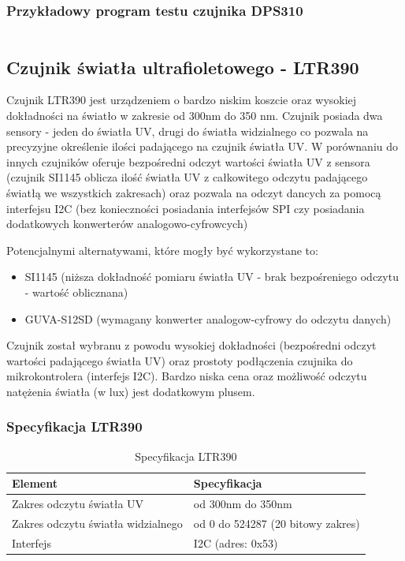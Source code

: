 \documentclass[12pt,a4paper]{article}
\begin{document}
\subsubsection{Przykładowy program testu czujnika DPS310}

\begin{code}[H]
\inputminted[frame=lines,baselinestretch=1,breaklines,linenos,xleftmargin=1.5em]{c}{../proj/dps310-test/dps310-test.ino}

\caption{Test czujnika DPS310}
\end{code}

\subsection{Czujnik światła ultrafioletowego - LTR390}

Czujnik LTR390 jest urządzeniem o bardzo niskim koszcie oraz wysokiej dokładności na światło w zakresie od 300nm do 350 nm. Czujnik posiada dwa sensory - jeden do światła UV, drugi do światła widzialnego 
co pozwala na precyzyjne określenie ilości padającego na czujnik światła UV. W porównaniu do innych czujników oferuje bezpośredni odczyt wartości światła UV z sensora (czujnik SI1145 oblicza ilość światła UV z całkowitego odczytu padającego światłą we wszystkich zakresach) 
oraz pozwala na odczyt dancych za pomocą interfejsu I2C (bez konieczności posiadania interfejsów SPI czy posiadania dodatkowych konwerterów analogowo-cyfrowcych) 

Potencjalnymi alternatywami, które mogły być wykorzystane to:
\begin{itemize}
    \item SI1145 (niższa dokładność pomiaru światła UV - brak bezpośreniego odczytu - wartość oblicznana)
    \item GUVA-S12SD (wymagany konwerter analogow-cyfrowy do odczytu danych)
\end{itemize}

Czujnik został wybranu z powodu wysokiej dokładności (bezpośredni odczyt wartości padającego światła UV) oraz prostoty podłączenia czujnika do mikrokontrolera (interfejs I2C). 
Bardzo niska cena oraz możliwość odczytu natężenia światła (w lux) jest dodatkowym plusem.

\subsubsection{Specyfikacja LTR390}

\begin{table}[H]
    \centering
    \begin{tabular}{|l|l|}
        \hline
        Element & Specyfikacja \\
        \hline
        Zakres odczytu światła UV & od 300nm do 350nm \\
        \hline
        Zakres odczytu światła widzialnego & od 0 do 524287 (20 bitowy zakres) \\
        \hline
        Interfejs & I2C (adres: 0x53) \\
        \hline
    \end{tabular}
    \caption{Specyfikacja LTR390}
    \label{ltr390-spec}
\end{table}
\end{document}
